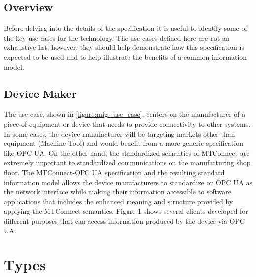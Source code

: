 \documentclass{mtconnect}	%
\begin{document}
\subsection{Overview}

Before delving into the details of the specification it is useful to identify some of the key use cases for the technology. The use cases defined here are not an exhaustive list; however, they should help demonstrate how this specification is expected to be used and to help illustrate the benefits of a common information model.

\subsection{Device Maker}

The use case, shown in \ref{figure:mfg_use_case}, centers on the manufacturer of a piece of equipment or device that needs to provide connectivity to other systems. In some cases, the device manufacturer will be targeting markets other than equipment (Machine Tool) and would benefit from a more generic specification like OPC UA. On the other hand, the standardized semantics of MTConnect are extremely important to standardized communications on the manufacturing shop floor. The MTConnect-OPC UA specification and the resulting standard information model allows the device manufacturers to standardize on OPC UA as the network interface while making their information accessible to software applications that includes the enhanced meaning and structure provided by applying the MTConnect semantics. Figure 1 shows several clients developed for different purposes that can access information produced by the device via OPC UA.

\clearpage
\section{Types}\label{types}
\FloatBarrier


\end{document}
